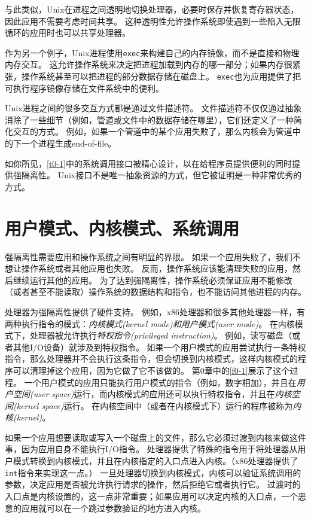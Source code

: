 与此类似，Unix在进程之间透明地切换处理器，必要时保存并恢复寄存器状态，因此应用不需要考虑时间共享。
这种透明性允许操作系统即使遇到一些陷入无限循环的应用时也可以共享处理器。

作为另一个例子，Unix进程使用\texttt{exec}来构建自己的内存镜像，而不是直接和物理内存交互。
这允许操作系统来决定把进程加载到内存的哪一部分；如果内存很紧张，操作系统甚至可以把进程的部分数据存储在磁盘上。
\texttt{exec}也为应用提供了把可执行程序镜像存储在文件系统中的便利。

Unix进程之间的很多交互方式都是通过文件描述符。
文件描述符不仅仅通过抽象消除了一些细节（例如，管道或文件中的数据存储在哪里），它们还定义了一种简化交互的方式。
例如，如果一个管道中的某个应用失败了，那么内核会为管道中的下一个进程生成end-of-file。

如你所见，\autoref{t0-1}中的系统调用接口被精心设计，以在给程序员提供便利的同时提供强隔离性。
Unix接口不是唯一抽象资源的方式，但它被证明是一种非常优秀的方式。

\section*{用户模式、内核模式、系统调用}
强隔离性需要应用和操作系统之间有明显的界限。
如果一个应用失败了，我们不想让操作系统或者其他应用也失败。
反而，操作系统应该能清理失败的应用，然后继续运行其他的应用。
为了达到强隔离性，操作系统必须保证应用不能修改（或者甚至不能读取）操作系统的数据结构和指令，也不能访问其他进程的内存。

处理器为强隔离性提供了硬件支持。
例如，x86处理器和很多其他处理器一样，有两种执行指令的模式：\emph{内核模式(kernel mode)和\emph{用户模式(user mode)}}。
在内核模式下，处理器被允许执行\emph{特权指令(privileged instruction)}。
例如，读写磁盘（或者其他I/O设备）就涉及到特权指令。
如果一个用户模式的应用尝试执行一条特权指令，那么处理器并不会执行这条指令，但会切换到内核模式，这样内核模式的程序可以清理掉这个应用，因为它做了它不该做的。
第0章中的\autoref{f0-1}展示了这个过程。
一个用户模式的应用只能执行用户模式的指令（例如，数字相加），并且在\emph{用户空间(user space)}运行，而内核模式的应用还可以执行特权指令，并且在\emph{内核空间(kernel space)}运行。
在内核空间中（或者在内核模式下）运行的程序被称为\emph{内核(kernel)}。

如果一个应用想要读取或写入一个磁盘上的文件，那么它必须过渡到内核来做这件事，因为应用自身不能执行I/O指令。
处理器提供了特殊的指令用于将处理器从用户模式转换到内核模式，并且在内核指定的入口点进入内核。（x86处理器提供了\texttt{int}指令来实现这一点。）
一旦处理器切换到内核模式，内核可以验证系统调用的参数，决定应用是否被允许执行请求的操作，然后拒绝它或者执行它。
过渡时的入口点是内核设置的，这一点非常重要；如果应用可以决定内核的入口点，一个恶意的应用就可以在一个跳过参数验证的地方进入内核。


